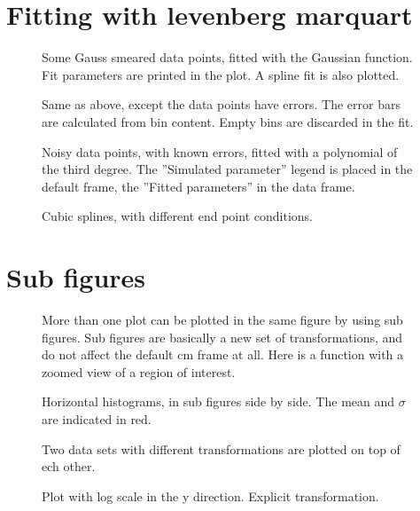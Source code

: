 \documentclass{article}
\begin{document}
\section{Fitting with levenberg marquart}
\begin{figure}[H]
\centering

\caption{Some Gauss smeared data points, fitted with the Gaussian function. Fit parameters are printed in the plot. 
A spline fit is also plotted.}
\end{figure}
\begin{figure}[H]
\centering

\caption{Same as above, except the data points have errors. The error bars are calculated from bin content.
Empty bins are discarded in the fit.}
\end{figure}
\begin{figure}[H]
\centering

\caption{Noisy data points, with known errors, fitted with a polynomial of the third degree. 
The ''Simulated parameter'' legend is placed in the default frame, the ''Fitted parameters'' 
in the data frame.}
\end{figure}
\begin{figure}[H]
\centering

\caption{Cubic splines, with different end point conditions.}
\end{figure}
\section{Sub figures}
\begin{figure}[H]
\centering

\caption{More than one plot can be plotted in the same figure by using sub figures.
Sub figures are basically a new set of transformations, and do not affect the default cm frame at all.
Here is a function with a zoomed view of a region of interest.}
\end{figure}
\begin{figure}[H]
\centering

\caption{Horizontal histograms, in sub figures side by side. The mean and $\sigma$ are indicated in red.}
\end{figure}
\begin{figure}[H]
\centering

\caption{Two data sets with different transformations are plotted on top of ech other.}
\end{figure}
\begin{figure}[H]
\centering

\caption{Plot with log scale in the y direction. Explicit transformation.}
\end{figure}
\end{document}
